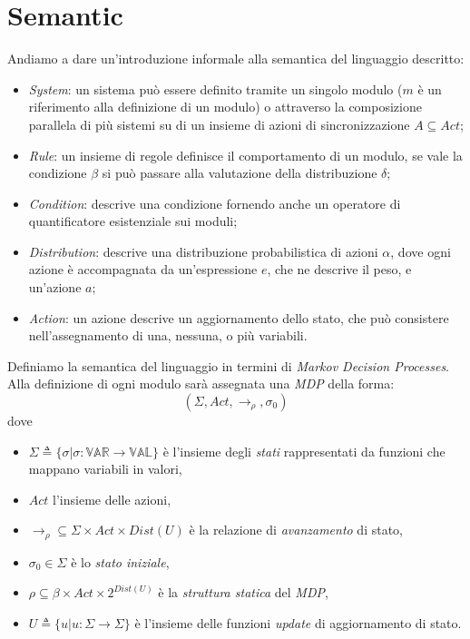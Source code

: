 \documentclass{article}
\begin{document}
\section{Semantic}
Andiamo a dare un'introduzione informale alla semantica del linguaggio descritto:
\begin{itemize}
	\item \emph{System}: un sistema può essere definito tramite un singolo modulo ($m$ è un riferimento alla definizione di un modulo) o attraverso la composizione parallela di più sistemi su di un insieme di azioni di sincronizzazione $A \subseteq Act$;
	\item \emph{Rule}: un insieme di regole definisce il comportamento di un modulo, se vale la condizione $\beta$ si può passare alla valutazione della distribuzione $\delta$;
	\item \emph{Condition}: descrive una condizione fornendo anche un operatore di quantificatore esistenziale sui moduli;
	\item \emph{Distribution}: descrive una distribuzione probabilistica di azioni $\alpha$, dove ogni azione è accompagnata da un'espressione $e$, che ne descrive il peso, e un'azione $a$;
	\item \emph{Action}: un azione descrive un aggiornamento dello stato, che può consistere nell'assegnamento di una, nessuna, o più variabili.
\end{itemize}

Definiamo la semantica del linguaggio in termini di \emph{Markov Decision Processes}. Alla definizione di ogni modulo sarà assegnata una \emph{MDP} della forma:
$$ (\Sigma,Act,\rightarrow_\rho,\sigma_0) $$
dove 
\begin{itemize}
	\item $\Sigma \triangleq \{\sigma | \sigma : \mathbb{VAR} \rightarrow \mathbb{VAL}\}$ è l'insieme degli \emph{stati} rappresentati da funzioni che mappano variabili in valori,
	\item $Act$ l'insieme delle azioni,
	\item $\rightarrow_\rho \subseteq \Sigma \times Act \times Dist(U)$ è la relazione di \emph{avanzamento} di stato,
	\item $\sigma_0 \in \Sigma$ è lo \emph{stato iniziale},
	\item $\rho \subseteq \beta \times Act \times 2^{Dist(U)}$ è la \emph{struttura statica} del \emph{MDP},
	\item $U \triangleq \{u | u : \Sigma \rightarrow \Sigma \}$ è l'insieme delle funzioni \emph{update} di aggiornamento di stato.
\end{itemize}
\end{document}
